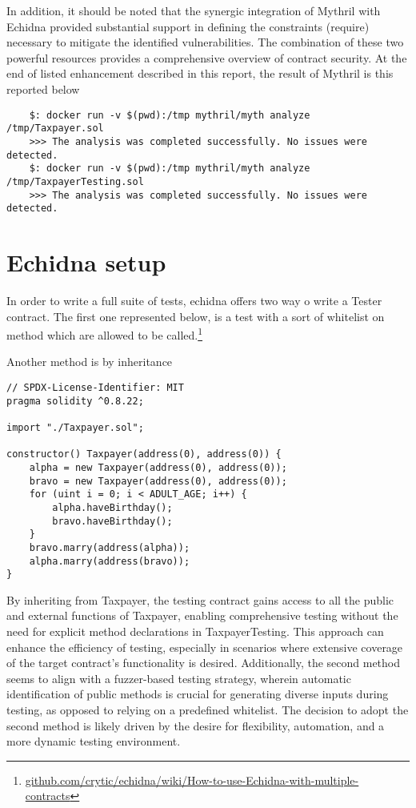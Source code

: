 \documentclass{article}
\begin{document}
In addition, it should be noted that the synergic integration of Mythril with Echidna provided substantial support in defining the constraints (require) necessary to mitigate the identified vulnerabilities. The combination of these two powerful resources provides a comprehensive overview of contract security.
At the end of listed enhancement described in this report, the result of Mythril is this reported below
\begin{verbatim}
    $: docker run -v $(pwd):/tmp mythril/myth analyze /tmp/Taxpayer.sol
    >>> The analysis was completed successfully. No issues were detected.
    $: docker run -v $(pwd):/tmp mythril/myth analyze /tmp/TaxpayerTesting.sol
    >>> The analysis was completed successfully. No issues were detected.
\end{verbatim}

\section{Echidna setup}
In order to write a full suite of tests, echidna offers two way o write a Tester contract. The first one represented below, is a test with a sort of whitelist on method which are allowed to be called.\footnote{\href{https://github.com/crytic/echidna/wiki/How-to-use-Echidna-with-multiple-contracts}{github.com/crytic/echidna/wiki/How-to-use-Echidna-with-multiple-contracts}}

Another method is by inheritance
\begin{verbatim}
// SPDX-License-Identifier: MIT
pragma solidity ^0.8.22;

import "./Taxpayer.sol";

constructor() Taxpayer(address(0), address(0)) {
    alpha = new Taxpayer(address(0), address(0));
    bravo = new Taxpayer(address(0), address(0));
    for (uint i = 0; i < ADULT_AGE; i++) {
        alpha.haveBirthday();
        bravo.haveBirthday();
    }
    bravo.marry(address(alpha));
    alpha.marry(address(bravo));
}
\end{verbatim}
By inheriting from Taxpayer, the testing contract gains access to all the public and external functions of Taxpayer, enabling comprehensive testing without the need for explicit method declarations in TaxpayerTesting. This approach can enhance the efficiency of testing, especially in scenarios where extensive coverage of the target contract's functionality is desired. Additionally, the second method seems to align with a fuzzer-based testing strategy, wherein automatic identification of public methods is crucial for generating diverse inputs during testing, as opposed to relying on a predefined whitelist. The decision to adopt the second method is likely driven by the desire for flexibility, automation, and a more dynamic testing environment.
\end{document}
